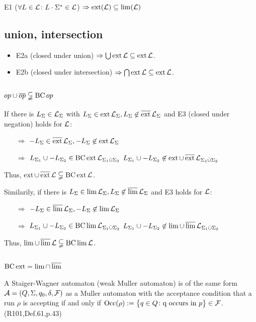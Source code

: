 E1 ($\forall L \in \mathcal{L} \colon L \cdot \Sigma^* \in \mathcal{L}$)
$\Rightarrow \operatorname{ext}(\mathcal{L}) \subseteq \lim(\mathcal{L})$

\subsection{union, intersection}
\begin{itemize}
\item
E2a (closed under union) $\Rightarrow \bigcup \operatorname{ext} \mathcal{L} \subseteq \operatorname{ext} \mathcal{L}$.
\item
E2b (closed under intersection) $\Rightarrow \bigcap \operatorname{ext} \mathcal{L} \subseteq \operatorname{ext} \mathcal{L}$.
\end{itemize}

\subsection{$op \cup \overline{op} \subsetneqq \operatorname{BC} op$}
If there is $L_\Sigma \in \mathcal{L}_\Sigma$ with $L_\Sigma \in \operatorname{ext} \mathcal{L}_\Sigma, L_\Sigma \not\in \operatorname{\overline{ext}} \mathcal{L}_\Sigma$ and E3 (closed under negation) holds for $\mathcal{L}$:
\begin{itemize}
\item[$\Rightarrow$] $-L_\Sigma \in \operatorname{\overline{ext}} \mathcal{L}_\Sigma, -L_\Sigma \not\in \operatorname{ext} \mathcal{L}_\Sigma$
\item[$\Rightarrow$] $L_{\Sigma_1} \cup -L_{\Sigma_2} \in \operatorname{BC} \operatorname{ext} \mathcal{L}_{\Sigma_1 \dot{\cup} \Sigma_2}$ \newline
$L_{\Sigma_1} \cup -L_{\Sigma_2} \not\in \operatorname{ext} \cup \operatorname{\overline{ext}} \mathcal{L}_{\Sigma_1 \dot{\cup} \Sigma_2}$
\end{itemize}
Thus, $\operatorname{ext} \cup \operatorname{\overline{ext}} \mathcal{L} \subsetneqq \operatorname{BC} \operatorname{ext} \mathcal{L}$.

Similarily, if there is $L_\Sigma \in \lim \mathcal{L}_\Sigma, L_\Sigma \not\in \operatorname{\overline{lim}} \mathcal{L}_\Sigma$ and E3 holds for $\mathcal{L}$:
\begin{itemize}
\item[$\Rightarrow$] $-L_\Sigma \in \operatorname{\overline{lim}} \mathcal{L}_\Sigma, -L_\Sigma \not\in \lim \mathcal{L}_\Sigma$
\item[$\Rightarrow$] $L_{\Sigma_1} \cup -L_{\Sigma_2} \in \operatorname{BC} \lim \mathcal{L}_{\Sigma_1 \dot{\cup} \Sigma_2}$ \newline
$L_{\Sigma_1} \cup -L_{\Sigma_2} \not\in \lim \cup \operatorname{\overline{lim}} \mathcal{L}_{\Sigma_1 \dot{\cup} \Sigma_2}$
\end{itemize}
Thus, $\lim \cup \operatorname{\overline{lim}} \mathcal{L} \subsetneqq \operatorname{BC} \lim \mathcal{L}$.


\subsection{$\operatorname{BC} \operatorname{ext} = \lim \cap \operatorname{\overline{lim}}$}
\label{gen:staiger-wagner}
A Staiger-Wagner automaton (weak Muller automaton) is of the same form $\mathcal{A} = (Q,\Sigma,q_0,\delta,\mathcal{F})$ as a Muller automaton with the acceptance condition that a run $\rho$ is accepting if and only if $\Occ(\rho) := \Set{q \in Q \colon \text{q occurs in } p} \in \F$.  (R101,Def.61,p.43)

